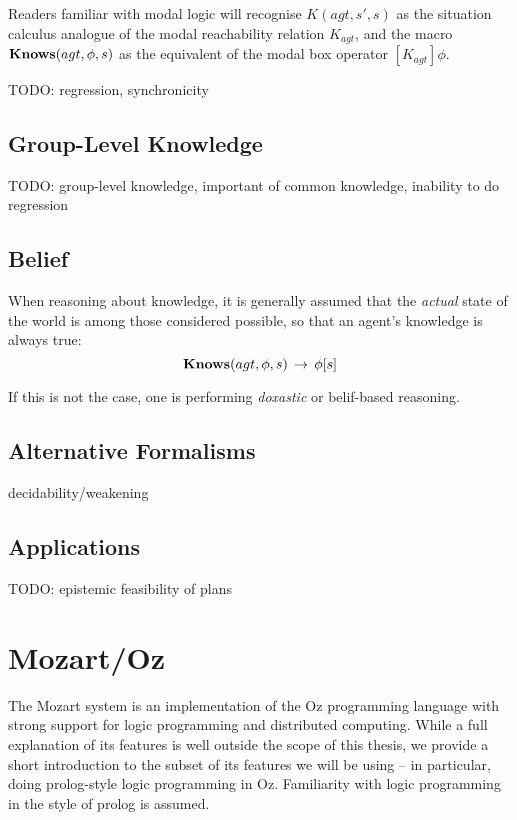Readers familiar with modal logic will recognise $K(agt,s',s)$ as
the situation calculus analogue of the modal reachability relation
$K_{agt}$, and the macro $\mathbf{Knows}(agt,\phi,s)$ as the equivalent
of the modal box operator $[K_{agt}]\phi$.

TODO: regression, synchronicity


\subsection{Group-Level Knowledge}

TODO: group-level knowledge, important of common knowledge, inability
to do regression


\subsection{Belief}

When reasoning about knowledge, it is generally assumed that the \emph{actual}
state of the world is among those considered possible, so that an
agent's knowledge is always true:\[
\mathbf{Knows}(agt,\phi,s)\,\rightarrow\,\phi[s]\]


If this is not the case, one is performing \emph{doxastic} or belif-based
reasoning.


\subsection{Alternative Formalisms }

decidability/weakening \citep{demolombe00tractable_sc_belief} \citep{petrick02knowledge_equivalence}


\subsection{Applications}

TODO: epistemic feasibility of plans \citep{giacomo04sem_delib_indigolog,Lesperance01epi_feas_casl}


\section{Mozart/Oz\label{sec:Background:Mozart/Oz}}

The Mozart system \citep{vanroy99mozart} is an implementation of
the Oz programming language \citep{vanRoyHaridi04ctm} with strong
support for logic programming and distributed computing. While a full
explanation of its features is well outside the scope of this thesis,
we provide a short introduction to the subset of its features we will
be using -- in particular, doing prolog-style logic programming in
Oz. Familiarity with logic programming in the style of prolog is assumed.

